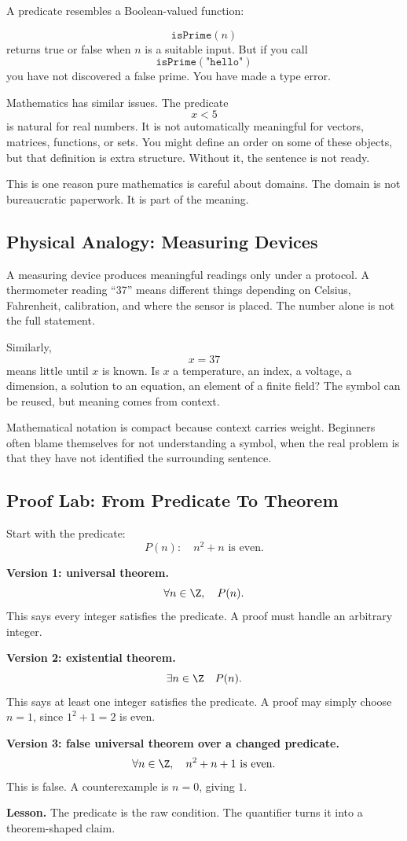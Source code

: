 A predicate resembles a Boolean-valued function:

\[
\texttt{isPrime}(n)
\]
returns true or false when $n$ is a suitable input. But if you call
\[
\texttt{isPrime}(\texttt{"hello"})
\]
you have not discovered a false prime. You have made a type error.

Mathematics has similar issues. The predicate
\[
x<5
\]
is natural for real numbers. It is not automatically meaningful for vectors, matrices, functions, or sets. You might define an order on some of these objects, but that definition is extra structure. Without it, the sentence is not ready.

This is one reason pure mathematics is careful about domains. The domain is not bureaucratic paperwork. It is part of the meaning.

\subsection{Physical Analogy: Measuring Devices}

A measuring device produces meaningful readings only under a protocol. A thermometer reading ``37'' means different things depending on Celsius, Fahrenheit, calibration, and where the sensor is placed. The number alone is not the full statement.

Similarly,
\[
x=37
\]
means little until $x$ is known. Is $x$ a temperature, an index, a voltage, a dimension, a solution to an equation, an element of a finite field? The symbol can be reused, but meaning comes from context.

Mathematical notation is compact because context carries weight. Beginners often blame themselves for not understanding a symbol, when the real problem is that they have not identified the surrounding sentence.

\subsection{Proof Lab: From Predicate To Theorem}

\begin{labbox}
Start with the predicate:
\[
P(n):\quad n^2+n\text{ is even}.
\]

\textbf{Version 1: universal theorem.}
\[
\forall n\in\Z,\quad P(n).
\]
This says every integer satisfies the predicate. A proof must handle an arbitrary integer.

\textbf{Version 2: existential theorem.}
\[
\exists n\in\Z\quad P(n).
\]
This says at least one integer satisfies the predicate. A proof may simply choose $n=1$, since $1^2+1=2$ is even.

\textbf{Version 3: false universal theorem over a changed predicate.}
\[
\forall n\in\Z,\quad n^2+n+1\text{ is even}.
\]
This is false. A counterexample is $n=0$, giving $1$.

\textbf{Lesson.}
The predicate is the raw condition. The quantifier turns it into a theorem-shaped claim.
\end{labbox}

